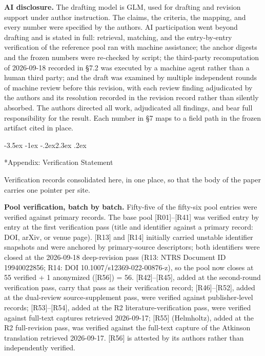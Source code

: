 \documentclass[11pt,a4paper]{article}
\makeatletter
\renewcommand\section{\@startsection{section}{1}{\z@}%
  {-3.5ex \@plus -1ex \@minus -.2ex}{2.3ex \@plus .2ex}%
  {\normalfont\Large\bfseries\raggedright}}
\makeatother
\begin{document}
\textbf{AI disclosure.} The drafting model is GLM, used for drafting and revision support under author instruction. The claims, the criteria, the mapping, and every number were specified by the authors. AI participation went beyond drafting and is stated in full: retrieval, matching, and the entry-by-entry verification of the reference pool ran with machine assistance; the anchor digests and the frozen numbers were re-checked by script; the third-party recomputation of 2026-09-18 recorded in §7.2 was executed by a machine agent rather than a human third party; and the draft was examined by multiple independent rounds of machine review before this revision, with each review finding adjudicated by the authors and its resolution recorded in the revision record rather than silently absorbed. The authors directed all work, adjudicated all findings, and bear full responsibility for the result. Each number in §7 maps to a field path in the frozen artifact cited in place.

\section*{Appendix: Verification Statement}

Verification records consolidated here, in one place, so that the body of the paper carries one pointer per site.

\textbf{Pool verification, batch by batch.} Fifty-five of the fifty-six pool entries were verified against primary records. The base pool [R01]–[R41] was verified entry by entry at the first verification pass (title and identifier against a primary record: DOI, arXiv, or venue page). [R13] and [R14] initially carried unstable identifier snapshots and were anchored by primary-source descriptors; both identifiers were closed at the 2026-09-18 deep-revision pass (R13: NTRS Document ID 19940022856; R14: DOI 10.1007/s12369-022-00876-z), so the pool now closes at 55 verified + 1 anonymized ([R56]) = 56. [R42]–[R45], added at the second-round verification pass, carry that pass as their verification record; [R46]–[R52], added at the dual-review source-supplement pass, were verified against publisher-level records; [R53]–[R54], added at the R2 literature-verification pass, were verified against full-text captures retrieved 2026-09-17; [R55] (Helmholtz), added at the R2 full-revision pass, was verified against the full-text capture of the Atkinson translation retrieved 2026-09-17. [R56] is attested by its authors rather than independently verified.
\end{document}
